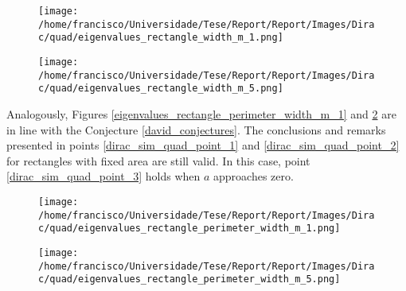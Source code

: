 \documentclass[5p,authoryear]{elsarticle}
\begin{document}
\begin{figure}
    \centering
    \begin{minipage}{.25\textwidth}
      \centering
      \texttt{[image: /home/francisco/Universidade/Tese/Report/Report/Images/Dirac/quad/eigenvalues\_rectangle\_width\_m\_1.png]}
      \captionsetup{width=0.9\linewidth} %
      \label{eigenvalues_rectangle_width_m_1}
    \end{minipage}%
    \begin{minipage}{.25\textwidth}
      \centering
      \texttt{[image: /home/francisco/Universidade/Tese/Report/Report/Images/Dirac/quad/eigenvalues\_rectangle\_width\_m\_5.png]}
      \captionsetup{width=0.9\linewidth} %
      \label{eigenvalues_rectangle_width_m_5}
    \end{minipage}
\end{figure}

Analogously, Figures \ref{eigenvalues_rectangle_perimeter_width_m_1} and \ref{eigenvalues_rectangle_perimeter_width_m_5} are in line with the Conjecture \ref{david_conjectures}. The conclusions and remarks presented in points \ref{dirac_sim_quad_point_1} and \ref{dirac_sim_quad_point_2} for rectangles with fixed area are still valid. In this case, point \ref{dirac_sim_quad_point_3} holds when \(a\) approaches zero.
\begin{figure}
    \centering
    \begin{minipage}{.25\textwidth}
      \centering
      \texttt{[image: /home/francisco/Universidade/Tese/Report/Report/Images/Dirac/quad/eigenvalues\_rectangle\_perimeter\_width\_m\_1.png]}
      \captionsetup{width=0.9\linewidth} %
      \label{eigenvalues_rectangle_perimeter_width_m_1}
    \end{minipage}%
    \begin{minipage}{.25\textwidth}
      \centering
      \texttt{[image: /home/francisco/Universidade/Tese/Report/Report/Images/Dirac/quad/eigenvalues\_rectangle\_perimeter\_width\_m\_5.png]}
      \captionsetup{width=0.9\linewidth} %
      \label{eigenvalues_rectangle_perimeter_width_m_5}
    \end{minipage}
\end{figure}
\end{document}
